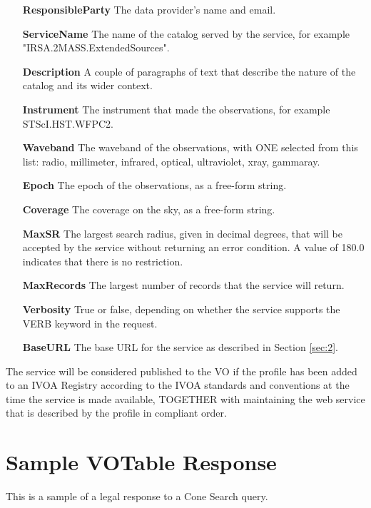 \documentclass[11pt,a4paper]{ivoa}
\begin{document}
\begin{itemize}
	\item[\textbf{ResponsibleParty}] The data provider's name and email.
	\item[\textbf{ServiceName}] The name of the
		catalog served by the service, for example "IRSA.2MASS.ExtendedSources".
	\item[\textbf{Description}] A couple of paragraphs of text that describe
		the nature of the catalog and its wider context.
	\item[\textbf{Instrument}] The instrument that made the observations,
		for example STScI.\-HST.\-WFPC2.
	\item[\textbf{Waveband}] The waveband
		of the observations, with ONE selected from this list: radio,
		millimeter, infrared, optical, ultraviolet, xray, gammaray.
	\item[\textbf{Epoch}] The epoch of the observations, as a free-form string.
	\item[\textbf{Coverage}] The coverage on the sky, as a free-form string.
	\item[\textbf{MaxSR}] The largest search radius, given in decimal
		degrees, that will be accepted by the service without returning an error
		condition. A value of 180.0 indicates that there is no restriction.
	\item[\textbf{MaxRecords}] The largest number of records that the
		service will return.
	\item[\textbf{Verbosity}] True or false, depending
		on whether the service supports the VERB keyword in the request.
	\item[\textbf{BaseURL}] The base URL for the service as described in
		Section \ref{sec:2}.
\end{itemize}

The service will be considered
published to the VO if the profile has been added to an IVOA Registry
according to the IVOA standards and conventions at the time the service
is made available, TOGETHER with maintaining the web service that is
described by the profile in compliant order.

\appendix

\section{Sample VOTable Response}
\label{appendix:a}

This is a sample of a legal response to a Cone Search query.
\end{document}
